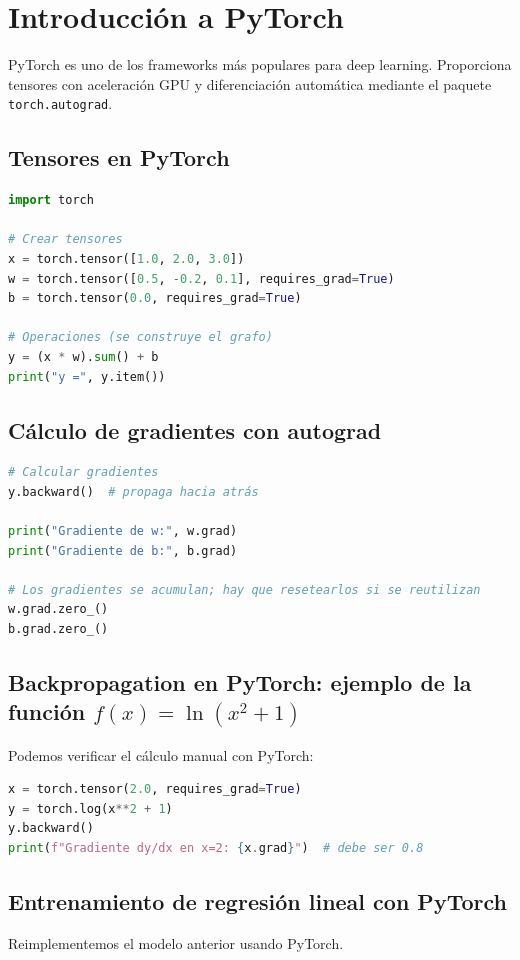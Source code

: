 \documentclass[12pt,a4paper,openany,oneside]{book}
\begin{document}
\section{Introducción a PyTorch}

PyTorch es uno de los frameworks más populares para deep learning. Proporciona tensores con aceleración GPU y diferenciación automática mediante el paquete \texttt{torch.autograd}.

\subsection{Tensores en PyTorch}
\begin{lstlisting}[language=Python]
import torch

# Crear tensores
x = torch.tensor([1.0, 2.0, 3.0])
w = torch.tensor([0.5, -0.2, 0.1], requires_grad=True)
b = torch.tensor(0.0, requires_grad=True)

# Operaciones (se construye el grafo)
y = (x * w).sum() + b
print("y =", y.item())
\end{lstlisting}

\subsection{Cálculo de gradientes con autograd}
\begin{lstlisting}[language=Python]
# Calcular gradientes
y.backward()  # propaga hacia atrás

print("Gradiente de w:", w.grad)
print("Gradiente de b:", b.grad)

# Los gradientes se acumulan; hay que resetearlos si se reutilizan
w.grad.zero_()
b.grad.zero_()
\end{lstlisting}

\subsection{Backpropagation en PyTorch: ejemplo de la función $f(x)=\ln(x^2+1)$}
Podemos verificar el cálculo manual con PyTorch:
\begin{lstlisting}[language=Python]
x = torch.tensor(2.0, requires_grad=True)
y = torch.log(x**2 + 1)
y.backward()
print(f"Gradiente dy/dx en x=2: {x.grad}")  # debe ser 0.8
\end{lstlisting}

\subsection{Entrenamiento de regresión lineal con PyTorch}
Reimplementemos el modelo anterior usando PyTorch.
\end{document}
